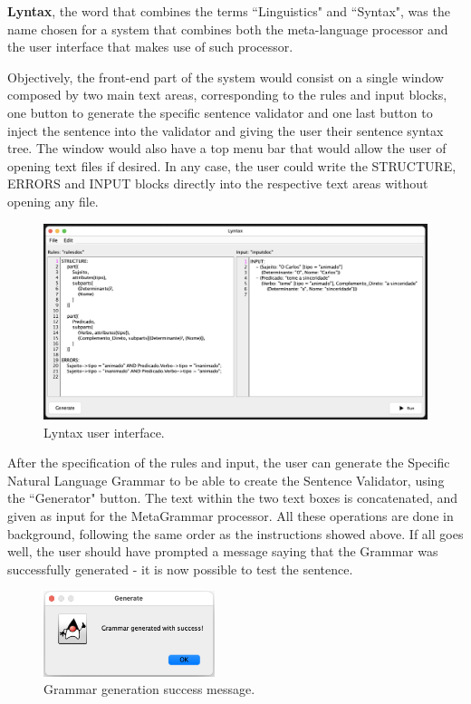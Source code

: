 \textbf{Lyntax}, the word that combines the terms ``Linguistics" and ``Syntax", was the name chosen for a system that combines both the meta-language processor and
the user interface that makes use of such processor.

Objectively, the front-end part of the system would consist on a single window composed by two main text areas, corresponding to the rules and input blocks,
one button to generate the specific sentence validator and one last button to inject the sentence into the validator and giving the user their sentence syntax tree.
The window would also have a top menu bar that would allow the user of opening text files if desired.
In any case, the user could write the STRUCTURE, ERRORS and INPUT blocks directly into the respective text areas without opening any file. 

\begin{figure}[h]
    \centering
    \includegraphics[width=14cm]{images/lyntax-gui.png}
    \caption{Lyntax user interface.}
    \label{fig:lyntaxGui}
\end{figure}

After the specification of the rules and input, the user can generate the Specific Natural Language Grammar to be able to create the Sentence Validator,
using the ``Generator" button.
The text within the two text boxes is concatenated, and given as input for the MetaGrammar processor.
All these operations are done in background, following the same order as the instructions showed above.
If all goes well, the user should have prompted a message saying that the Grammar was successfully generated - it is now possible to test the sentence.

\begin{figure}[h]
    \centering
    \includegraphics[width=5cm]{images/grammar_gen_success.png}
    \caption{Grammar generation success message.}
    \label{fig:grammarGenSuccess}
\end{figure}

